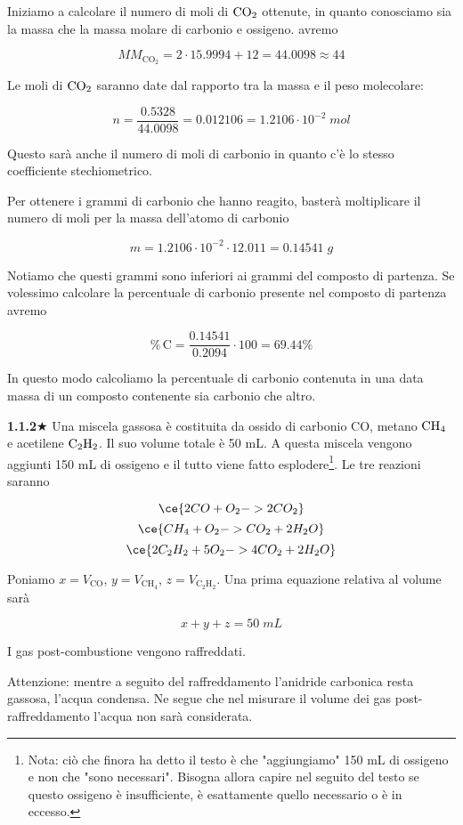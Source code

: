 Iniziamo a calcolare il numero di moli di $\rm CO_2$ ottenute, in quanto conosciamo sia la massa che la massa molare di carbonio e ossigeno. avremo

$$MM_{\text{CO}_2}=2 \cdot 15.9994 + 12 = 44.0098 \approx 44$$

Le moli di $\rm CO_2$ saranno date dal rapporto tra la massa e il peso molecolare:

$$n=\frac{0.5328}{44.0098}=0.012106=1.2106 \cdot 10^{-2} \; mol$$

Questo sarà anche il numero di moli di carbonio in quanto c'è lo stesso coefficiente stechiometrico.

Per ottenere i grammi di carbonio che hanno reagito, basterà moltiplicare il numero di moli per la massa dell'atomo di carbonio

$$m=1.2106 \cdot 10^{-2} \cdot 12.011=0.14541 \; g$$

Notiamo che questi grammi sono inferiori ai grammi del composto di partenza. Se volessimo calcolare la percentuale di carbonio presente nel composto di partenza avremo

$$\%\,\text{C}=\frac{0.14541}{0.2094}\cdot 100 = 69.44 \%$$

In questo modo calcoliamo la percentuale di carbonio contenuta in una data massa di un composto contenente sia carbonio che altro.

\vspace{0.2cm}\textbf{1.1.2}$\bigstar$ Una miscela gassosa è costituita da ossido di carbonio CO, metano $\rm CH_4$ e acetilene $\rm C_2H_2$. Il suo volume totale è 50 mL. A questa miscela vengono aggiunti 150 mL di ossigeno e il tutto viene fatto esplodere\footnote{Nota: ciò che finora ha detto il testo è che "aggiungiamo" 150 mL di ossigeno e non che "sono necessari". Bisogna allora capire nel seguito del testo se questo ossigeno è insufficiente, è esattamente quello necessario o è in eccesso.}. Le tre reazioni saranno

$$\ce{2CO + O_2 -> 2CO_2}$$
$$\ce{CH_4 + O_2 -> CO_2 + 2H_2O}$$
$$\ce{2C_2H_2 + 5O_2 -> 4CO_2 + 2H_2O}$$

Poniamo $x=V_{\text{CO}}$, $y=V_{\text{CH}_4}$, $z=V_{\text{C}_2\text{H}_2}$. Una prima equazione relativa al volume sarà

$$x+y+z=50 \; mL$$

I gas post-combustione vengono raffreddati.

Attenzione: mentre a seguito del raffreddamento l'anidride carbonica resta gassosa, l'acqua condensa. Ne segue che nel misurare il volume dei gas post-raffreddamento l'acqua non sarà considerata.

